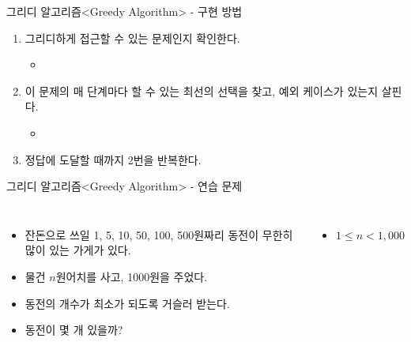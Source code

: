 \begin{frame}{그리디 알고리즘}{<Greedy Algorithm> - 구현 방법}
  \begin{enumerate}
    \item 그리디하게 접근할 수 있는 문제인지 확인한다.
    \begin{itemize}
      \item[] 
    \end{itemize}
    \item 이 문제의 매 단계마다 할 수 있는 최선의 선택을 찾고, 예외 케이스가 있는지 살핀다.
    \begin{itemize}
      \item[] 
    \end{itemize}
    \item 정답에 도달할 때까지 2번을 반복한다.
  \end{enumerate}
\end{frame}

\begin{frame}{그리디 알고리즘}{<Greedy Algorithm> - 연습 문제}
  \begin{center}
  \end{center}
  \vspace{4mm}
  \begin{columns}[T]
      \begin{itemize}
        \item 잔돈으로 쓰일 \alert{1, 5, 10, 50, 100, 500원짜리} 동전이 무한히 많이 있는 가게가 있다.
        \item 물건 \alert{$n$원}어치를 사고, 1000원을 주었다.
        \item 동전의 개수가 \alert{최소}가 되도록 거슬러 받는다.
        \item \alert{동전이 몇 개 있을까?}
      \end{itemize}
      \begin{itemize}
        \item $1 \le n < 1{,}000$
      \end{itemize}
  \end{columns}
\end{frame}

